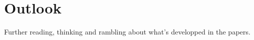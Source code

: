 

\chapter{Outlook}

Further reading, thinking and rambling about what's developped in the papers.


